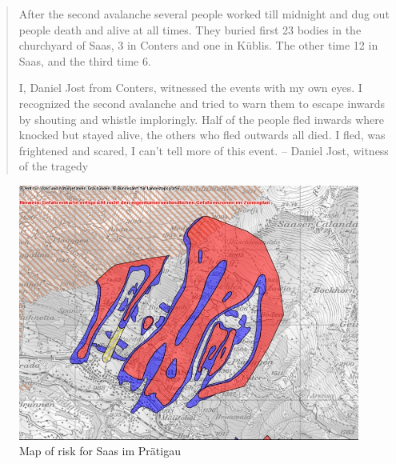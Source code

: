 \documentclass[12pt, a4paper]{article}
\begin{document}
\begin{quote}
After the second avalanche several people worked till midnight and dug out people death and alive at all times. They buried first 23 bodies in the churchyard of Saas, 3 in Conters and one in Küblis. The other time 12 in Saas, and the third time 6. 

I, Daniel Jost from Conters, witnessed the events with my own eyes. I recognized the second avalanche and tried to warn them to escape inwards by shouting and whistle imploringly. Half of the people fled inwards where knocked but stayed alive, the others who fled outwards all died. I fled, was frightened and scared, I can't tell more of this event.
 -- Daniel Jost, witness of the tragedy \cite[p.~50]{hansemann1995saaser}
\end{quote}


 \citep[p.~99]{pfister2002tag}

\begin{figure}[htpb!]
\includegraphics[width=\textwidth,natwidth=610,natheight=642]{literature/gefahrenkarte.jpg}
\caption{Map of risk for Saas im Prätigau \cite{gefahrenkarte}}
\end{figure}


\end{document}
